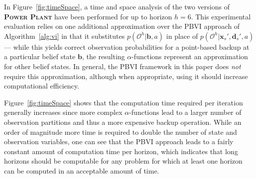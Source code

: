 \documentclass{article} %
\renewcommand{\vec}[1]{\mathbf{#1}} %
\newcommand{\xdsp}{\mathbf{x}_s',\!\mathbf{d}_s'}
\begin{document}
In Figure~\ref{fig:timeSpace}, a time and space analysis of the two
versions of \textsc{\bf Power Plant} have been performed for up to 
horizon $h=6$. This experimental evaluation relies on one additional
  approximation over the PBVI approach of Algorithm~\ref{alg:vi} 
  in that it substitutes $p(\mathcal{O}^h|\vec{b},a)$
  in place of $p(\mathcal{O}^h|\xdsp,a)$ --- while this yields correct
  observation probabilities for a point-based backup at a particular
  belief state $\vec{b}$, the resulting $\alpha$-functions represent
  an approximation for other belief states.  In general, the PBVI
  framework in this paper does \emph{not} require this approximation,
  although when appropriate, using it should increase computational
  efficiency.  

Figure~\ref{fig:timeSpace} shows that the computation time required
per iteration generally increases since more complex $\alpha$-functions lead to
a larger number of observation partitions and thus a more expensive
backup operation.  While an order of magnitude more time is required
to double the number of state and observation variables, one can
see that the PBVI approach leads to a fairly constant amount of computation
time per horizon, which indicates that long horizons should be computable
for any problem for which at least one horizon can be computed in an
acceptable amount of time.


\end{document}
